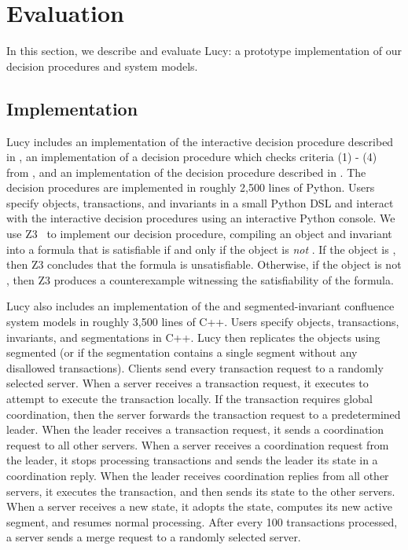 \section{Evaluation}
In this section, we describe and evaluate Lucy: a prototype implementation of
our decision procedures and system models.

\subsection{Implementation}
Lucy includes an implementation of the interactive decision procedure described
in , an implementation of a decision
procedure which checks criteria (1) - (4) from , and an
implementation of the decision procedure described in
. The decision procedures
are implemented in roughly 2,500 lines of Python. Users specify objects,
transactions, and invariants in a small Python DSL and interact with the
interactive decision procedures using an interactive Python console. We use
Z3~\cite{de2008z3} to implement our \invariantclosure{} decision procedure,
compiling an object and invariant into a formula that is satisfiable if and
only if the object is \emph{not} \invariantclosed{}. If the object is
\invariantclosed{}, then Z3 concludes that the formula is unsatisfiable.
Otherwise, if the object is not \invariantclosed{}, then Z3 produces a
counterexample witnessing the satisfiability of the formula.

Lucy also includes an implementation of the \invariantconfluence{} and
segmented-invariant confluence system models in roughly 3,500 lines of C++.
Users specify objects, transactions, invariants, and segmentations in C++. Lucy
then replicates the objects using segmented \invariantconfluence{} (or
\invariantconfluence{} if the segmentation contains a single segment without
any disallowed transactions). Clients send every transaction request to a
randomly selected server. When a server receives a transaction request, it
executes  to attempt to execute the transaction locally.
If the transaction requires global coordination, then the server forwards the
transaction request to a predetermined leader. When the leader receives a
transaction request, it sends a coordination request to all other servers. When
a server receives a coordination request from the leader, it stops processing
transactions and sends the leader its state in a coordination reply. When the
leader receives coordination replies from all other servers, it executes the
transaction, and then sends its state to the other servers. When a server
receives a new state, it adopts the state, computes its new active segment, and
resumes normal processing. After every 100 transactions processed, a server
sends a merge request to a randomly selected server.

